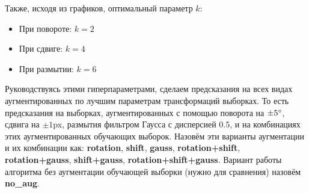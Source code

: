\documentclass[12pt]{article}
\begin{document}
Также, исходя из графиков, оптимальный параметр $k$:
\begin{itemize}
    \item При повороте: $k = 2$
    \item При сдвиге: $k = 4$
    \item При размытии: $k = 6$
\end{itemize}

Руководствуясь этими гиперпараметрами, сделаем предсказания на всех видах аугментированных по лучшим параметрам трансформаций выборках. То есть предсказания на выборках, аугментированных с помощью поворота на $\pm5\degree$, сдвига на $\pm1$px, размытия фильтром Гаусса с дисперсией $0.5$, и на комбинациях этих аугментированных обучающих выборок. Назовём эти варианты аугментации и их комбинации как: \textbf{rotation}, \textbf{shift}, \textbf{gauss}, \textbf{rotation+shift}, \textbf{rotation+gauss}, \textbf{shift+gauss}, \textbf{rotation+shift+gauss}. Вариант работы алгоритма без аугментации обучающей выборки (нужно для сравнения) назовём \textbf{no\_aug}.

\break
\end{document}
